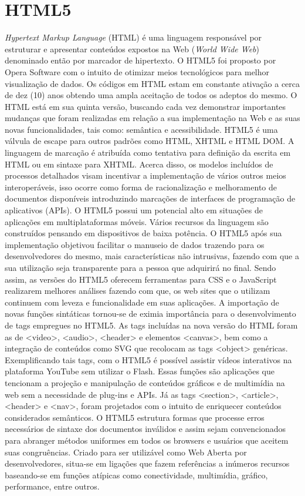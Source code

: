 \documentclass[12pt,a4paper]{article}
\begin{document}
\section{HTML5}
\textit{Hypertext Markup Language} (HTML) é uma linguagem responsável por estruturar e apresentar conteúdos expostos na Web (\textit{World Wide Web}) denominado então por marcador de hipertexto. O HTML5 foi proposto por Opera Software com o intuito de otimizar meios tecnológicos para melhor visualização de dados. Os códigos em HTML estam em constante ativação a cerca de dez (10) anos obtendo uma ampla aceitação de todos os adeptos do mesmo. 
	O HTML está em sua quinta versão, buscando cada vez demonstrar importantes mudanças que foram realizadas em relação a sua implementação na Web e as suas novas funcionalidades, tais como: semântica e acessibilidade. HTML5 é uma válvula de escape para outros padrões como HTML, XHTML e HTML DOM. 
	A linguagem de marcação é atribuída como tentativa para definição da escrita em HTML ou em sintaxe para XHTML. Acerca disso, os modelos incluídos de processos detalhados visam incentivar a implementação de vários outros meios interoperáveis, isso ocorre como forma de racionalização e melhoramento de documentos disponíveis introduzindo marcações de interfaces de programação de aplicativos (APIs). O HTML5 possui um potencial alto em situações de aplicações em multiplataformas móveis. Vários recursos da linguagem são construídos pensando em dispositivos de baixa potência. 
	O HTML5 após sua implementação objetivou facilitar o manuseio de dados trazendo para os desenvolvedores do mesmo, mais características não intrusivas, fazendo com que a sua utilização seja transparente para a pessoa que adquirirá no final. Sendo assim, as versões do HTML5 oferecem ferramentas para CSS e o JavaScript realizarem melhores análises fazendo com que, os web sites que o utilizam continuem com leveza e funcionalidade em suas aplicações. A importação de novas funções sintáticas tornou-se de eximia importância para o desenvolvimento de tags empregues no HTML5. 
	As tags incluídas na nova versão do HTML foram as de <video>, <audio>, <header> e elementos <canvas>, bem como a integração de conteúdos como SVG que recolocam as tags <object> genéricas. Exemplificando tais tags, com o HTML5 é possível assistir vídeos interativos na plataforma YouTube sem utilizar o Flash. Essas funções são aplicações que tencionam a projeção e manipulação de conteúdos gráficos e de multimídia na web sem a necessidade de plug-ins e APIs. Já as tags <section>, <article>, <header> e <nav>, foram projetados com o intuito de enriquecer conteúdos considerados semânticos. 
	O HTML5 estrutura formas que processe erros necessários de sintaxe dos documentos inválidos e assim sejam convencionados para abranger métodos uniformes em todos os browsers e usuários que aceitem suas congruências. Criado para ser utilizável como Web Aberta por desenvolvedores, situa-se em ligações que fazem referências a inúmeros recursos baseando-se em funções atípicas como conectividade, multimídia, gráfico, performance, entre outros. 
	
\end{document}
